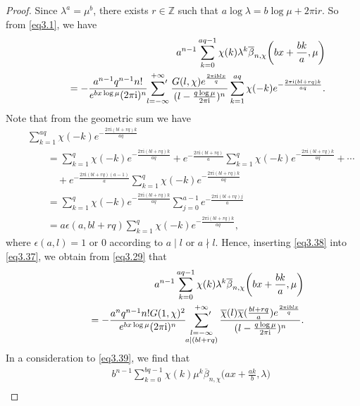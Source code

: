 \documentclass[reqno]{amsart}
\numberwithin{equation}{section}
\begin{document}
\begin{proof}
Since $\lambda^{a}=\mu^{b}$, there exists $r\in\mathbb{Z}$ such that $a\log\lambda=b\log\mu+2\pi\mathrm{i}r$. So from \eqref{eq3.1}, we have
\begin{eqnarray}\label{eq3.37}
&&a^{n-1}\sum_{k=0}^{aq-1}\chi(k)\lambda^{k}\overline{\beta}_{n,\chi}\biggl(bx+\frac{bk}{a},\mu\biggl)\nonumber\\
&&\qquad=-\frac{a^{n-1}q^{n-1}n!}{e^{bx\log\mu}(2\pi \mathrm{i})^{n}}\sideset{}{'}\sum_{l=-\infty}^{+\infty}\frac{G(l,\chi)e^{\frac{2\pi\mathrm{i}blx}{q}}}{(l-\frac{q\log\mu}{2\pi\mathrm{i}})^{n}}\sum_{k=1}^{aq}\chi(-k)e^{-\frac{2\pi\mathrm{i}(bl+rq)k}{aq}}.
\end{eqnarray}
Note that from the geometric sum we have
\begin{eqnarray}\label{eq3.38}
&&\sum_{k=1}^{aq}\chi(-k)e^{-\frac{2\pi\mathrm{i}(bl+rq)k}{aq}}\nonumber\\
&&\qquad=\sum_{k=1}^{q}\chi(-k)e^{-\frac{2\pi\mathrm{i}(bl+rq)k}{aq}}+e^{-\frac{2\pi\mathrm{i}(bl+rq)}{a}}
\sum_{k=1}^{q}\chi(-k)e^{-\frac{2\pi\mathrm{i}(bl+rq)k}{aq}}+\cdots\nonumber\\
&&\qquad\quad+e^{-\frac{2\pi\mathrm{i}(bl+rq)(a-1)}{a}}\sum_{k=1}^{q}\chi(-k)e^{-\frac{2\pi\mathrm{i}(bl+rq)k}{aq}}\nonumber\\
&&\qquad=\sum_{k=1}^{q}\chi(-k)e^{-\frac{2\pi\mathrm{i}(bl+rq)k}{aq}}\sum_{j=0}^{a-1}e^{-\frac{2\pi\mathrm{i}(bl+rq)j}{a}}\nonumber\\
&&\qquad= a\epsilon(a,bl+rq)\sum_{k=1}^{q}\chi(-k)e^{-\frac{2\pi\mathrm{i}(bl+rq)k}{aq}},
\end{eqnarray}
where $\epsilon(a,l)=1$ or $0$ according to $a\mid l$ or $a\nmid l$. Hence, inserting \eqref{eq3.38} into \eqref{eq3.37}, we obtain from \eqref{eq3.29} that
\begin{eqnarray}\label{eq3.39}
&&a^{n-1}\sum_{k=0}^{aq-1}\chi(k)\lambda^{k}\overline{\beta}_{n,\chi}\biggl(bx+\frac{bk}{a},\mu\biggl)\nonumber\\
&&\qquad=-\frac{a^{n}q^{n-1}n!G(1,\chi)^{2}}{e^{bx\log\mu}(2\pi \mathrm{i})^{n}}\sideset{}{'}\sum_{\substack{l=-\infty\\a\mid (bl+rq)}}^{+\infty}\frac{\overline{\chi}(l)\overline{\chi}(\frac{bl+rq}{a})e^{\frac{2\pi\mathrm{i}blx}{q}}}{(l-\frac{q\log\mu}{2\pi\mathrm{i}})^{n}}.
\end{eqnarray}
In a consideration to \eqref{eq3.39}, we find that
\begin{eqnarray}\label{eq3.40}
&&b^{n-1}\sum_{k=0}^{bq-1}\chi(k)\mu^{k}\overline{\beta}_{n,\chi}\biggl(ax+\frac{ak}{b},\lambda\biggl)\nonumber\\

\end{eqnarray}
\end{proof}
\end{document}
